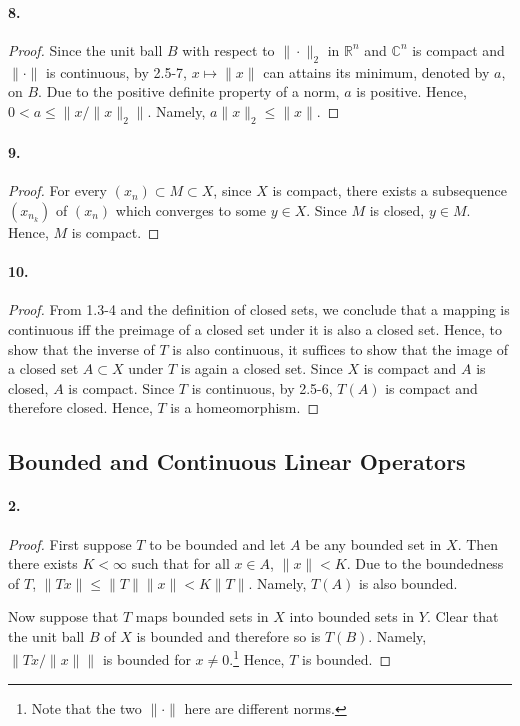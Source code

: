   \paragraph{8.}
  \begin{proof}
    Since the unit ball $B$ with respect to $\|\cdot\|_2$ in $\mathbb{R}^n$ and
    $\mathbb{C}^n$ is compact and $\|\cdot\|$ is continuous, by 2.5-7, $x\mapsto
    \|x\|$ can attains its minimum, denoted by $a$, on $B$. Due to the positive 
    definite property of a norm, $a$ is positive. Hence, $0<a\le \|x/\|x\|_2\|$.
    Namely, $a\|x\|_2\le\|x\|$.
  \end{proof}

  \paragraph{9.}
  \begin{proof}
    For every $(x_n)\subset M\subset X$, since $X$ is compact, there exists a 
    subsequence $(x_{n_k})$ of $(x_n)$ which converges to some $y\in X$. Since 
    $M$ is closed, $y\in M$. Hence, $M$ is compact.
  \end{proof}

  \paragraph{10.}
  \begin{proof}
    From 1.3-4 and the definition of closed sets, we conclude that a mapping is
    continuous iff the preimage of a closed set under it is also a closed set.
    Hence, to show that the inverse of $T$ is also continuous, it suffices to
    show that the image of a closed set $A\subset X$ under $T$ is again a closed
    set. Since $X$ is compact and $A$ is closed, $A$ is compact. Since $T$ is 
    continuous, by 2.5-6, $T(A)$ is compact and therefore closed. Hence, $T$ is
    a homeomorphism.
  \end{proof}

\setcounter{subsection}{6}
\subsection{Bounded and Continuous Linear Operators}
  \paragraph{2.}
  \begin{proof}
    First suppose $T$ to be bounded and let $A$ be any bounded set in $X$. Then
    there exists $K<\infty$ such that for all $x\in A$, $\|x\|<K$. Due to the
    boundedness of $T$, $\|Tx\|\le \|T\|\|x\|<K\|T\|$. Namely, $T(A)$ is also
    bounded.\par
    Now suppose that $T$ maps bounded sets in $X$ into bounded sets in $Y$. 
    Clear that the unit ball $B$ of $X$ is bounded and therefore so is $T(B)$.
    Namely, $\|Tx/\|x\|\|$ is bounded for $x\ne 0$.\footnote{Note that the two
    $\|\cdot\|$ here are different norms.} Hence, $T$ is bounded.
  \end{proof}

